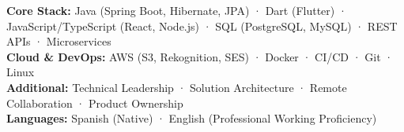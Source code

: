 
\begin{cvparagraph}
\textbf{Core Stack:} Java (Spring Boot, Hibernate, JPA) · Dart (Flutter) · JavaScript/TypeScript (React, Node.js) · SQL (PostgreSQL, MySQL) · REST APIs · Microservices
\\
\textbf{Cloud \& DevOps:} AWS (S3, Rekognition, SES) · Docker · CI/CD · Git · Linux
\\
\textbf{Additional:} Technical Leadership · Solution Architecture · Remote Collaboration · Product Ownership
\\
\textbf{Languages:} Spanish (Native) · English (Professional Working Proficiency)
\end{cvparagraph}
